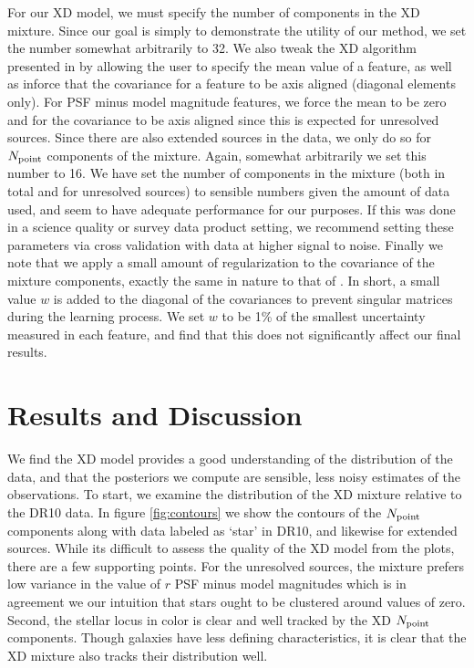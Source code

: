 \documentclass[12pt,preprint]{aastex}
\begin{document}
For our XD model, we must specify the number of components in the XD mixture.
Since our goal is simply to demonstrate the utility of our method, we set the 
number somewhat arbitrarily to 32.  We also tweak the XD algorithm presented in
\citet{bovy09} by allowing the user to specify the mean value of a feature,
as well as inforce that the covariance for a feature to be axis aligned
(diagonal elements only).  For PSF minus model magnitude features, we force
the mean to be zero and for the covariance to be axis aligned since this is
expected for unresolved sources. Since there are also extended sources in the
data, we only do so for $N_{\rm point}$ components of the mixture.  Again,
somewhat arbitrarily we set this number to 16.  We have set the number of
components in the mixture (both in total and for unresolved sources) to
sensible numbers given the amount of data used, and seem to have adequate
performance for our purposes.  If this was done in a science quality or
survey data product setting, we recommend setting these parameters via cross
validation with data at higher signal to noise.  Finally we note that we 
apply a small amount of regularization to the covariance of the mixture
components, exactly the same in nature to that of \citet{bovy10}.  In short, 
a small value $w$ is added to the diagonal of the covariances to prevent
singular matrices during the learning process.  We set $w$ to be 1\% of the 
smallest uncertainty measured in each feature, and find that this does not
significantly affect our final results.

\section{Results and Discussion}
\label{sec:results}

We find the XD model provides a good understanding of the distribution of the 
data, and that the posteriors we compute are sensible, less noisy estimates of 
the observations.  To start, we examine the distribution of the XD mixture 
relative to the DR10 data.  In figure \ref{fig:contours} we show the contours 
of the $N_{\rm point}$ components along with data labeled as `star' in DR10,
and likewise for extended sources.  While its difficult to assess the quality
of the XD model from the plots, there are a few supporting points.  For the 
unresolved sources, the mixture prefers low variance in the value of $r$ PSF
minus model magnitudes which is in agreement we our intuition that stars
ought to be clustered around values of zero.  Second, the stellar locus in
color is clear and well tracked by the XD $N_{\rm point}$ components.  Though 
galaxies have less defining characteristics, it is clear that the XD mixture 
also tracks their distribution well.
\end{document}
